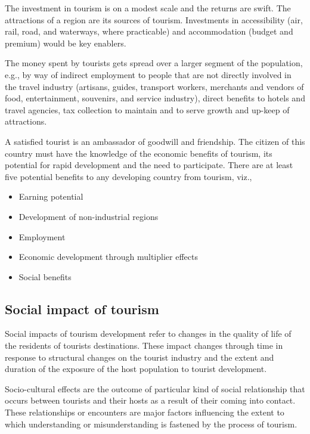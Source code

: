 The investment in tourism is on a modest scale and the returns are swift. The attractions of a region are its sources of tourism. Investments in accessibility (air, rail, road, and waterways, where practicable) and accommodation (budget and premium) would be key enablers.

The money spent by tourists gets spread over a larger segment of the population, e.g., by way of indirect employment to people that are not directly involved in the travel industry (artisans, guides, transport workers, merchants and vendors of food, entertainment, souvenirs, and service industry), direct benefits to hotels and travel agencies, tax collection to maintain and to serve growth and up-keep of attractions.

A satisfied tourist is an ambassador of goodwill and friendship. The citizen of this country must have the knowledge of the economic benefits of tourism, its potential for rapid development and the need to participate. There are at least five potential benefits to any developing country from tourism, viz.,

\begin{itemize}
  \item Earning potential
  \item Development of non-industrial regions
  \item Employment
  \item Economic development through multiplier effects
  \item Social benefits
\end{itemize}


\subsection{Social impact of tourism} %
\label{sub:simt}

Social impacts of tourism development refer to changes in the quality of life of the residents of tourists destinations. These impact changes through time in response to structural changes on the tourist industry and the extent and duration of the exposure of the host population to tourist development.

Socio-cultural effects are the outcome of particular kind of social relationship that occurs between tourists and their hosts as a result of their coming into contact. These relationships or encounters are major factors influencing the extent to which understanding or misunderstanding is fastened by the process of tourism.

